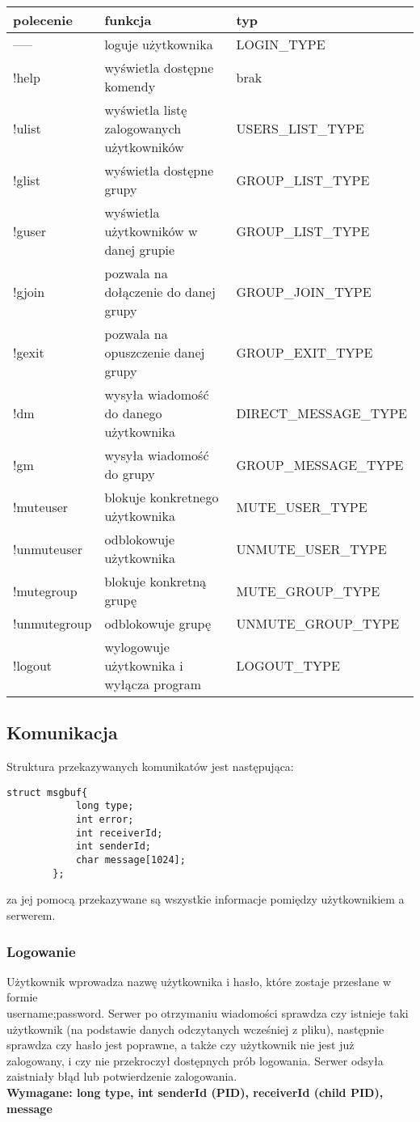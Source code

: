 \documentclass[11pt]{article}
\begin{document}
\begin{table}[!ht]
	\centering
	\begin{tabular}{|l|l|l|}
		\hline
		\textbf{polecenie} & \textbf{funkcja} & \textbf{typ} \\ \hline
		----- & loguje użytkownika & LOGIN\_TYPE \\ \hline
		!help & wyświetla dostępne komendy & brak \\ \hline
		!ulist & wyświetla listę zalogowanych użytkowników & USERS\_LIST\_TYPE \\ \hline
		!glist & wyświetla dostępne grupy & GROUP\_LIST\_TYPE \\ \hline
		!guser & wyświetla użytkowników w danej grupie & GROUP\_LIST\_TYPE \\ \hline
		!gjoin & pozwala na dołączenie do danej grupy & GROUP\_JOIN\_TYPE \\ \hline
		!gexit & pozwala na opuszczenie danej grupy & GROUP\_EXIT\_TYPE \\ \hline
		!dm & wysyła wiadomość do danego użytkownika& DIRECT\_MESSAGE\_TYPE \\ \hline
		!gm & wysyła wiadomość do grupy & GROUP\_MESSAGE\_TYPE \\ \hline
		!muteuser & blokuje konkretnego użytkownika & MUTE\_USER\_TYPE \\ \hline
		!unmuteuser & odblokowuje użytkownika & UNMUTE\_USER\_TYPE \\ \hline
		!mutegroup & blokuje konkretną grupę & MUTE\_GROUP\_TYPE \\ \hline
		!unmutegroup & odblokowuje grupę & UNMUTE\_GROUP\_TYPE \\ \hline
		!logout & wylogowuje użytkownika i wyłącza program & LOGOUT\_TYPE\\ \hline
	\end{tabular}
\end{table}
\pagebreak
	\subsection{Komunikacja}
	Struktura przekazywanych komunikatów jest następująca:
		\begin{lstlisting}[style = CStyle]
		struct msgbuf{
			long type;
			int error;
			int receiverId;
			int senderId;
			char message[1024];
		};\end{lstlisting}
	za jej pomocą przekazywane są wszystkie informacje pomiędzy użytkownikiem a serwerem.
	
	\subsubsection{Logowanie}
	Użytkownik wprowadza nazwę użytkownika i hasło, które zostaje przesłane w formie\\ username;password. Serwer po otrzymaniu wiadomości sprawdza czy istnieje taki użytkownik (na podstawie danych odczytanych wcześniej z pliku), następnie sprawdza czy hasło jest poprawne, a także czy użytkownik nie jest już zalogowany, i czy nie przekroczył dostępnych prób logowania. Serwer odsyła zaistniały błąd lub potwierdzenie zalogowania.\\
	\textbf{Wymagane: long type, int senderId (PID), receiverId (child PID), message}
\end{document}

